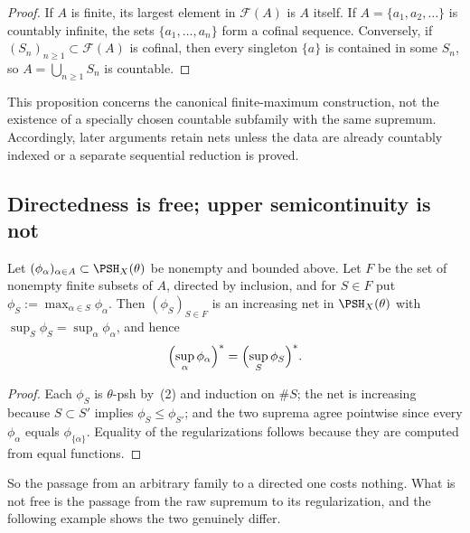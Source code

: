 \begin{proof}
If $A$ is finite, its largest element in $\mathcal F(A)$ is $A$ itself.  If
$A=\{a_1,a_2,\dots\}$ is countably infinite, the sets
$\{a_1,\dots,a_n\}$ form a cofinal sequence.  Conversely, if
$(S_n)_{n\geq1}\subset\mathcal F(A)$ is cofinal, then every singleton
$\{a\}$ is contained in some $S_n$, so
$A=\bigcup_{n\geq1}S_n$ is countable.
\end{proof}

This proposition concerns the canonical finite-maximum construction, not the
existence of a specially chosen countable subfamily with the same supremum.
Accordingly, later arguments retain nets unless the data are already
countably indexed or a separate sequential reduction is proved.

\subsection{Directedness is free; upper semicontinuity is not}

\begin{lemma}
\label{lem:ch36-directed-reduction}
Let $(\phi_\alpha)_{\alpha\in A}\subset\PSH_X(\theta)$ be nonempty and
bounded above.  Let $F$ be the set of nonempty finite subsets of $A$,
directed by inclusion, and for $S\in F$ put
$\phi_S:=\max_{\alpha\in S}\phi_\alpha$.
Then $(\phi_S)_{S\in F}$ is an increasing net in $\PSH_X(\theta)$ with
$\sup_S\phi_S=\sup_\alpha\phi_\alpha$, and hence
\[
 \Bigl(\sup_{\alpha}\phi_\alpha\Bigr)^*=\Bigl(\sup_{S}\phi_S\Bigr)^* .
\]
\end{lemma}

\begin{proof}
Each $\phi_S$ is $\theta$-psh by \,(2) and
induction on $\#S$; the net is increasing because $S\subset S'$ implies
$\phi_S\le\phi_{S'}$; and the two suprema agree pointwise since every
$\phi_\alpha$ equals $\phi_{\{\alpha\}}$.  Equality of the
regularizations follows because they are computed from equal functions.
\end{proof}

So the passage from an arbitrary family to a directed one costs nothing.
What is not free is the passage from the raw supremum to its regularization,
and the following example shows the two genuinely differ.

